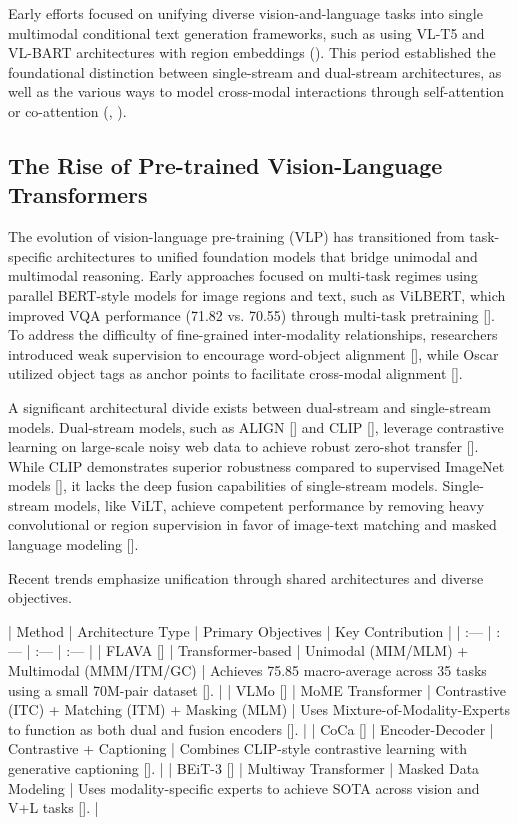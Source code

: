 \documentclass[11pt]{article}
\begin{document}
Early efforts focused on unifying diverse vision-and-language tasks into single multimodal conditional text generation frameworks, such as using VL-T5 and VL-BART architectures with region embeddings (\citep{2102.02779}). This period established the foundational distinction between single-stream and dual-stream architectures, as well as the various ways to model cross-modal interactions through self-attention or co-attention (\citep{2204.07356}, \citep{2202.10936}).
\subsection{The Rise of Pre-trained Vision-Language Transformers}

The evolution of vision-language pre-training (VLP) has transitioned from task-specific architectures to unified foundation models that bridge unimodal and multimodal reasoning. Early approaches focused on multi-task regimes using parallel BERT-style models for image regions and text, such as ViLBERT, which improved VQA performance (71.82 vs. 70.55) through multi-task pretraining [\citep{1912.02315}]. To address the difficulty of fine-grained inter-modality relationships, researchers introduced weak supervision to encourage word-object alignment [\citep{1912.03063}], while Oscar utilized object tags as anchor points to facilitate cross-modal alignment [\citep{2004.06165}].

A significant architectural divide exists between dual-stream and single-stream models. Dual-stream models, such as ALIGN [\citep{2102.05918}] and CLIP [\citep{2103.00020}], leverage contrastive learning on large-scale noisy web data to achieve robust zero-shot transfer [\citep{2103.00020}]. While CLIP demonstrates superior robustness compared to supervised ImageNet models [\citep{2103.00020}], it lacks the deep fusion capabilities of single-stream models. Single-stream models, like ViLT, achieve competent performance by removing heavy convolutional or region supervision in favor of image-text matching and masked language modeling [\citep{2102.03334}].

Recent trends emphasize unification through shared architectures and diverse objectives.

| Method | Architecture Type | Primary Objectives | Key Contribution |
| :--- | :--- | :--- | :--- |
| FLAVA [\citep{2112.04482}] | Transformer-based | Unimodal (MIM/MLM) + Multimodal (MMM/ITM/GC) | Achieves 75.85 macro-average across 35 tasks using a small 70M-pair dataset [\citep{2112.04482}]. |
| VLMo [\citep{2111.02358}] | MoME Transformer | Contrastive (ITC) + Matching (ITM) + Masking (MLM) | Uses Mixture-of-Modality-Experts to function as both dual and fusion encoders [\citep{2111.02358}]. |
| CoCa [\citep{2205.01917}] | Encoder-Decoder | Contrastive + Captioning | Combines CLIP-style contrastive learning with generative captioning [\citep{2205.01917}]. |
| BEiT-3 [\citep{2208.10442}] | Multiway Transformer | Masked Data Modeling | Uses modality-specific experts to achieve SOTA across vision and V+L tasks [\citep{2208.10442}]. |
\end{document}
